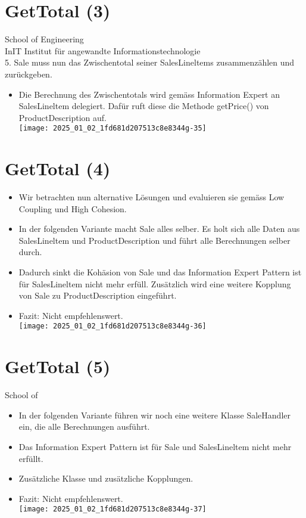\documentclass[10pt]{article}
\begin{document}
\section*{GetTotal (3)}
School of Engineering\\
InIT Institut für angewandte Informationstechnologie\\
5. Sale muss nun das Zwischentotal seiner SalesLineltems zusammenzählen und zurückgeben.

\begin{itemize}
  \item Die Berechnung des Zwischentotals wird gemäss Information Expert an SalesLineltem delegiert. Dafür ruft diese die Methode getPrice() von ProductDescription auf.\\
\texttt{[image: 2025\_01\_02\_1fd681d207513c8e8344g-35]}
\end{itemize}

\section*{GetTotal (4)}
\begin{itemize}
  \item Wir betrachten nun alternative Lösungen und evaluieren sie gemäss Low Coupling und High Cohesion.
  \item In der folgenden Variante macht Sale alles selber. Es holt sich alle Daten aus SalesLineltem und ProductDescription und führt alle Berechnungen selber durch.
  \item Dadurch sinkt die Kohäsion von Sale und das Information Expert Pattern ist für SalesLineltem nicht mehr erfüll. Zusätzlich wird eine weitere Kopplung von Sale zu ProductDescription eingeführt.
  \item Fazit: Nicht empfehlenswert.\\
\texttt{[image: 2025\_01\_02\_1fd681d207513c8e8344g-36]}
\end{itemize}

\section*{GetTotal (5)}
School of

\begin{itemize}
  \item In der folgenden Variante führen wir noch eine weitere Klasse SaleHandler ein, die alle Berechnungen ausführt.
  \item Das Information Expert Pattern ist für Sale und SalesLineltem nicht mehr erfüllt.
  \item Zusätzliche Klasse und zusätzliche Kopplungen.
  \item Fazit: Nicht empfehlenswert.\\
\texttt{[image: 2025\_01\_02\_1fd681d207513c8e8344g-37]}
\end{itemize}
\end{document}
